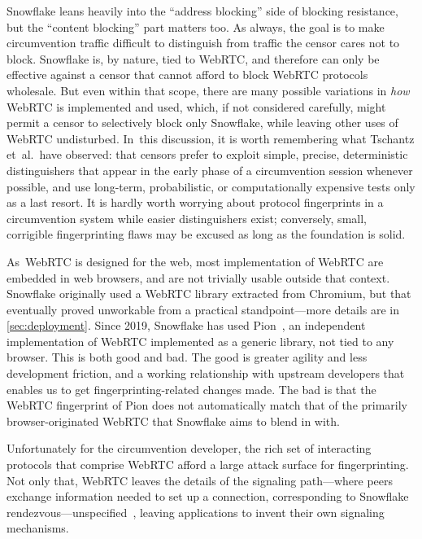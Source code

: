 \documentclass[letterpaper,twocolumn]{article}
\begin{document}
Snowflake leans heavily into the ``address blocking'' side of blocking resistance,
but the ``content blocking'' part matters too.
As always, the goal is to make circumvention traffic
difficult to distinguish from traffic the censor cares not to block.
Snowflake is, by nature, tied to WebRTC,
and therefore can only be effective against a censor
that cannot afford to block WebRTC protocols wholesale.
But even within that scope,
there are many possible variations in \emph{how}
WebRTC is implemented and used,
which, if not considered carefully, might permit a censor
to selectively block only Snowflake,
while leaving other uses of WebRTC undisturbed.
In~this discussion, it is worth remembering
what Tschantz et~al.\ have observed\cite[\mbox{VI-A}]{Tschantz2016a}:
that censors prefer to exploit
simple, precise, deterministic distinguishers
that appear in the early phase of a circumvention session whenever possible,
and use long-term, probabilistic, or computationally expensive tests
only as a last resort.
It is hardly worth worrying about protocol fingerprints
in a circumvention system while easier distinguishers exist;
conversely, small, corrigible fingerprinting flaws may be excused
as long as the foundation is solid.

As~WebRTC is designed for the web,
most implementation of WebRTC are embedded in web browsers,
and are not trivially usable outside that context.
Snowflake originally used a WebRTC library extracted from Chromium,
but that eventually proved unworkable from a practical standpoint---more
details are in \autoref{sec:deployment}.
Since 2019, Snowflake has used Pion~\cite{pion-webrtc},
an independent implementation of WebRTC
implemented as a generic library,
not tied to any browser.
This is both good and bad.
The good is greater agility and less development friction,
and a working relationship with upstream developers
that enables us to get fingerprinting-related changes made.
The bad is that the WebRTC fingerprint of Pion
does not automatically match that of the primarily browser-originated
WebRTC that Snowflake aims to blend in with.

Unfortunately for the circumvention developer,
the rich set of interacting protocols that comprise WebRTC
afford a large attack surface for fingerprinting.
Not only that, WebRTC leaves the details of
the signaling path---where peers exchange information
needed to set up a connection,
corresponding to Snowflake rendezvous---unspecified~\cite[\S 3]{rfc8825},
leaving applications to invent their own signaling mechanisms.
\end{document}
